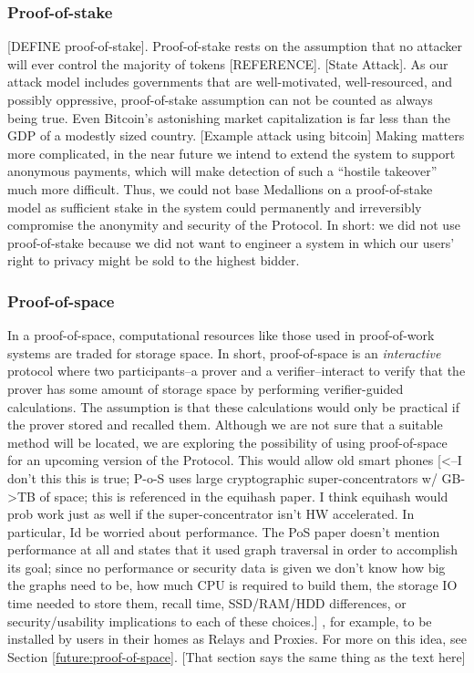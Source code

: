 \subsubsection{Proof-of-stake}

{\color{red}[DEFINE proof-of-stake]}. Proof-of-stake
rests on the assumption that no attacker will ever control the majority of tokens {\color{red}[REFERENCE]}. {\color{red}[State Attack]}. As our attack model includes governments that are well-motivated, well-resourced, and possibly oppressive, proof-of-stake assumption can not be counted as always being true. Even Bitcoin’s astonishing market capitalization is far less than the GDP of a modestly sized country. {\color{red} [Example attack using bitcoin]} Making matters more complicated, in the near future we intend to extend the system to support anonymous payments, which will make detection of such a ``hostile takeover'' much more difficult. Thus, we could not base Medallions on a proof-of-stake model as sufficient stake in the system could permanently and irreversibly compromise the anonymity and security of the \Orchid{} Protocol. In short: we did not use proof-of-stake because we did not want to engineer a system in which our users’ right to privacy might be sold to the highest bidder.

\subsubsection{Proof-of-space}

In a proof-of-space, computational resources like those used in proof-of-work systems are traded for storage space. In short, proof-of-space is an \textit{interactive} protocol where two participants--a prover and a verifier--interact to verify that the prover has some amount of storage space by performing verifier-guided calculations. The assumption is that these calculations would only be practical if the prover stored and recalled them\cite{dziembowski2015proofs}. Although we are not sure that a suitable method will be located, we are exploring the possibility of using proof-of-space for an upcoming version of the \Orchid{} Protocol. This would allow old smart phones 
{\color{red}[<--I don't this this is true; P-o-S uses large cryptographic super-concentrators w/ GB->TB of space; this is referenced in the equihash paper. I think equihash would prob work just as well if the super-concentrator isn't HW accelerated. In particular, Id be worried about performance. The PoS paper doesn't mention performance at all and states that it used graph traversal in order to accomplish its goal; since no performance or security data is given we don't know how big the graphs need to be, how much CPU is required to build them, the storage IO time needed to store them, recall time, SSD/RAM/HDD differences, or security/usability implications to each of these choices.]}
, for example, to be installed by users in their homes as Relays and Proxies. For more on this idea, see Section \ref{future:proof-of-space}. {\color{red}[That section says the same thing as the text here]}

